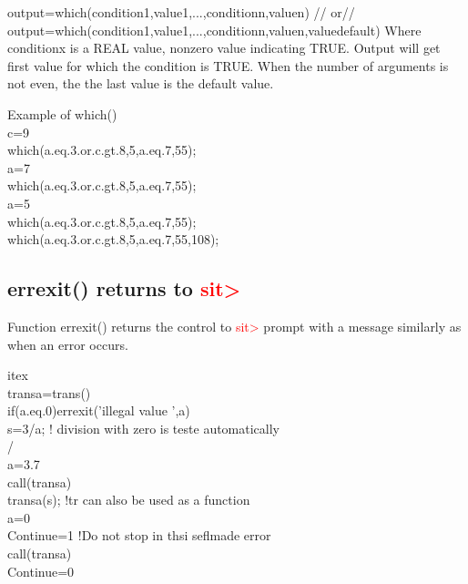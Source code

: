 output=\textcolor{VioletRed}{which}(condition1,value1,...,conditionn,valuen) //
or//
output=\textcolor{VioletRed}{which}(condition1,value1,...,conditionn,valuen,valuedefault)
Where conditionx is a REAL value, nonzero	value indicating TRUE. Output will get first value for which
the condition is TRUE. When the number of arguments is not even, the the last value
is the default value.
\begin{example}[whichex]Example of \textcolor{VioletRed}{which}()\\
\label{whichex}
c=9\\
\textcolor{VioletRed}{which}(a.eq.3.or.c.gt.8,5,a.eq.7,55);\\
a=7\\
\textcolor{VioletRed}{which}(a.eq.3.or.c.gt.8,5,a.eq.7,55);\\
a=5\\
\textcolor{VioletRed}{which}(a.eq.3.or.c.gt.8,5,a.eq.7,55);\\
\textcolor{VioletRed}{which}(a.eq.3.or.c.gt.8,5,a.eq.7,55,108);
\end{example}
\subsection{\textcolor{VioletRed}{errexit}() returns to \textcolor{Red}{sit>}}
\label{errexit}
Function \textcolor{VioletRed}{errexit}() returns the control to \textcolor{Red}{sit>} prompt with a message similarly
as when an error occurs.

\begin{example}[errexitex]itex\\
\label{errexitex}
transa=\textcolor{VioletRed}{trans}()\\
\textcolor{VioletRed}{if}(a.eq.0)\textcolor{VioletRed}{errexit}('illegal value ',a)\\
s=3/a; ! division with zero is teste automatically\\
/\\
a=3.7\\
\textcolor{VioletRed}{call}(transa)\\
transa(s); !tr can also be used as a function\\
a=0\\
Continue=1  !Do not stop in thsi seflmade error\\
\textcolor{VioletRed}{call}(transa)\\
Continue=0
\end{example}
